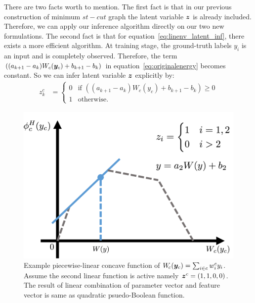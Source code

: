 There are two facts worth to mention. The first fact is that in
our previous construction of minimum $st-cut$ graph the latent
variable ${\bm{z}}$ is already included. Therefore, we can apply our
inference algorithm directly on our two new formulations. The
second fact is that for equation~\eqref{eq:linenv_latent_inf},
there exists a more efficient algorithm. At training stage, the
ground-truth labels $y_i$ is an input and is completely observed.
Therefore, the term $((a_{k+1}-a_k)W_c({\bm{y}}_c)+b_{k+1}-b_k)$ in
equation~\eqref{eq:originalenergy} becomes constant. So we can
infer latent variable ${\bm{z}}$ explicitly by:
\begin{align}
  \label{eq:linenv_effi_infer_latent}
  z_k^c &=
          \begin{cases}
            0 & \text{if $((a_{k+1}-a_k)W_c(y_c)+b_{k+1}-b_k)\geq0$} \\
            1 & \text{otherwise}.
          \end{cases}
\end{align}
\begin{figure}[t]
  \centering
  \includegraphics[width=0.8\columnwidth]{Part2/figures/linEnvLatentFig.png}
  \caption{\label{fig:concave} Example piecewise-linear concave
    function of $W_{\!c}({\bm{y}}_c) = \sum_{i \in c} w^c_i y_i$.
    Assume the second linear function is active namely
    ${\bm{z}}^c=(1,1,0,0)$. The result of linear combination of
    parameter vector and feature vector is same as quadratic
    psuedo-Boolean function.}
\end{figure}

